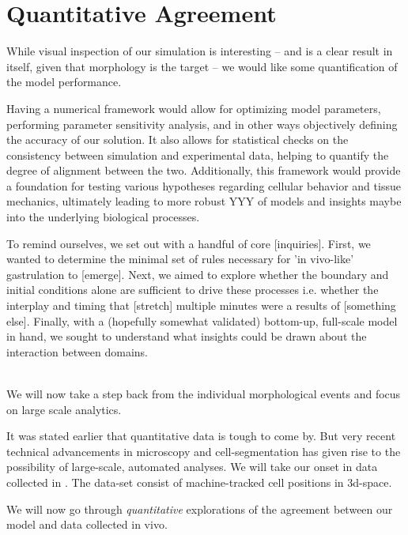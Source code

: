 \section{Quantitative Agreement}

While visual inspection of our simulation is interesting -- and is a clear result in itself, given that morphology is the target -- we would like some quantification of the model performance. 

Having a numerical framework would allow for optimizing model parameters, performing parameter sensitivity analysis, and in other ways objectively defining the accuracy of our solution. It also allows for statistical checks on the consistency between simulation and experimental data, helping to quantify the degree of alignment between the two. Additionally, this framework would provide a foundation for testing various hypotheses regarding cellular behavior and tissue mechanics, ultimately leading to more robust YYY of models and insights maybe into the underlying biological processes.


To remind ourselves, we set out with a handful of core [inquiries]. First, we wanted to determine the minimal set of rules necessary for 'in vivo-like' gastrulation to [emerge]. Next, we aimed to explore whether the boundary and initial conditions alone are sufficient to drive these processes i.e. whether the interplay and timing that [stretch] multiple minutes were a results of [something else]. Finally, with a (hopefully somewhat validated) bottom-up, full-scale model in hand, we sought to understand what insights could be drawn about the interaction between domains.


\\
We will now take a step back from the individual morphological events and focus on large scale analytics.

It was stated earlier that quantitative data is tough to come by. But very recent technical advancements in microscopy and cell-segmentation has given rise to the possibility of large-scale, automated analyses.\cite{stern2022deconstructing} We will take our onset in data collected in . The data-set consist of machine-tracked cell positions in 3d-space.

We will now go through \textit{quantitative} explorations of the agreement between our model and data collected in vivo. 


